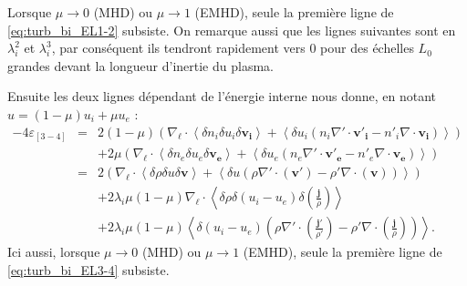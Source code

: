 Lorsque $\mu \rightarrow 0$ (\ac{MHD}) ou $\mu \rightarrow 1$ (\acs{EMHD}), seule la première ligne de \eqref{eq:turb_bi_EL1-2} subsiste. On remarque aussi que les lignes suivantes sont en $\lambda_i^2$ et $\lambda_i^3$, par conséquent ils tendront rapidement vers 0 pour des échelles $L_0$ grandes devant la longueur d'inertie du plasma. 

Ensuite les deux lignes dépendant de l'énergie interne nous donne, en notant $u = \left(1-\mu\right)u_i + \mu u_e$ : 
\begin{eqnarray}%
  - 4  \varepsilon_{[3-4]} 
   &=& 2  \left(1-\mu\right) \left(\nabla_{\boldsymbol{\ell}} \cdot\left<  \delta n_i  \delta u_i\delta \boldsymbol{v_i} \right> +\left<\delta u_i  \left(n_i \nabla' \cdot \boldsymbol{v'_i}- n'_i \nabla \cdot \boldsymbol{v_i}\right)\right> \right) \nonumber\\ %
  &&+ 2  \mu \left(\nabla_{\boldsymbol{\ell}} \cdot\left<  \delta n_e  \delta u_e\delta \boldsymbol{v_e} \right> +\left<\delta u_e  \left(n_e \nabla' \cdot \boldsymbol{v'_e}- n'_e \nabla \cdot \boldsymbol{v_e}\right)\right> \right)\ \nonumber \\ %
\label{eq:turb_bi_EL3-4} &=& 2  \left( \nabla_{\boldsymbol{\ell}} \cdot\left<  \delta \rho  \delta u \delta \boldsymbol{v} \right> +\left<\delta u  \left(\rho \nabla' \cdot \left(\boldsymbol{v'} \right)- \rho' \nabla \cdot \left(\boldsymbol{v}  \right)\right)\right> \right)\nonumber \\%
  &&+ 2 \lambda_i \mu\left(1-\mu\right) \nabla_{\boldsymbol{\ell}} \cdot\left<  \delta \rho  \delta \left(u_i-u_e\right) \delta \left(  \frac{\boldsymbol{j}}{\rho} \right)\right> \nonumber\\ %
  &&+ 2  \lambda_i \mu\left(1-\mu\right)\left<\delta \left(u_i-u_e\right)  \left(\rho \nabla' \cdot \left(  \frac{\boldsymbol{j'}}{\rho'} \right)- \rho' \nabla \cdot \left(\frac{\boldsymbol{j}}{\rho} \right)\right)\right> .
\end{eqnarray} %
Ici aussi, lorsque $\mu \rightarrow 0$ (\ac{MHD}) ou $\mu \rightarrow 1$ (\acs{EMHD}), seule la première ligne de  \eqref{eq:turb_bi_EL3-4} subsiste.

